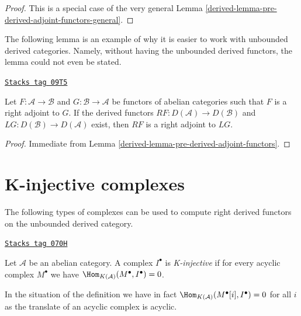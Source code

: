 \begin{proof}

This is a special case of the very general
Lemma \ref{derived-lemma-pre-derived-adjoint-functors-general}.
\end{proof}

The following lemma is an example of why it is easier to work
with unbounded derived categories. Namely, without having the
unbounded derived functors, the lemma could not even be stated.

\begin{lemma}
\label{derived-lemma-derived-adjoint-functors}
\href{https://stacks.math.columbia.edu/tag/09T5}{\texttt{Stacks tag 09T5}}

Let $F : \mathcal{A} \to \mathcal{B}$ and $G : \mathcal{B} \to \mathcal{A}$
be functors of abelian categories such that $F$ is a right adjoint to $G$.
If the derived functors $RF : D(\mathcal{A}) \to D(\mathcal{B})$ and
$LG : D(\mathcal{B}) \to D(\mathcal{A})$ exist, then
$RF$ is a right adjoint to $LG$.
\end{lemma}

\begin{proof}

Immediate from Lemma \ref{derived-lemma-pre-derived-adjoint-functors}.
\end{proof}

\section{K-injective complexes}
\label{derived-section-K-injective}
The following types of complexes can be used to compute right derived
functors on the unbounded derived category.

\begin{definition}[K injective]
\label{derived-definition-K-injective}
\href{https://stacks.math.columbia.edu/tag/070H}{\texttt{Stacks tag 070H}}

Let $\mathcal{A}$ be an abelian category. A complex $I^\bullet$
is {\it K-injective} if for every acyclic complex $M^\bullet$ we
have $\Hom_{K(\mathcal{A})}(M^\bullet, I^\bullet) = 0$.
\end{definition}

In the situation of the definition we have in fact
$\Hom_{K(\mathcal{A})}(M^\bullet[i], I^\bullet) = 0$ for all $i$
as the translate of an acyclic complex is acyclic.


